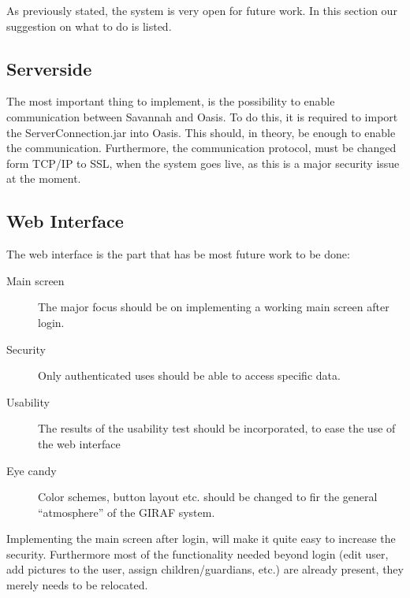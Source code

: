 As previously stated, the system is very open for future work. In this section our suggestion on what to do is listed.

\subsection*{Serverside}
The most important thing to implement, is the possibility to enable communication between Savannah and Oasis. To do this, it is required to import the ServerConnection.jar into Oasis. This should, in theory, be enough to enable the communication. Furthermore, the communication protocol, must be changed form TCP/IP to SSL, when the system goes live, as this is a major security issue at the moment.

\subsection*{Web Interface}
The web interface is the part that has be most future work to be done:
\begin{description}
	\item[Main screen] The major focus should be on implementing a working main screen after login.
	\item[Security] Only authenticated uses should be able to access specific data.
	\item[Usability] The results of the usability test should be incorporated, to ease the use of the web interface
	\item[Eye candy] Color schemes, button layout etc. should be changed to fir the general ``atmosphere'' of the GIRAF system.
\end{description}
Implementing the main screen after login, will make it quite easy to increase the security. Furthermore most of the functionality needed beyond login (edit user, add pictures to the user, assign children/guardians, etc.) are already present, they merely needs to be relocated.